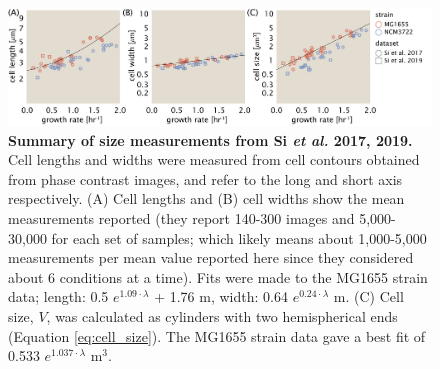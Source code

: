 \begin{figure}
		\centering
    \includegraphics[width=1.0\textwidth]{SI_figs/final_cell_size_Si.pdf}
    \caption{\textbf{Summary of size measurements from Si \textit{et al.} 2017,
    2019.} Cell lengths and widths were measured from cell contours obtained from
    phase contrast images, and refer to the long and short axis respectively. (A)
    Cell lengths and (B) cell widths show the mean measurements reported (they
    report 140-300 images and 5,000-30,000 for each set of samples; which likely
    means about 1,000-5,000 measurements per mean value reported here since they
    considered about 6 conditions at a time). Fits were made to the  MG1655 strain
    data; length: 0.5 $e^{1.09 \cdot \lambda}$ + 1.76 \textmu m, width:  0.64
    $e^{0.24 \cdot \lambda}$ \textmu m. (C) Cell size, $V$, was calculated as
    cylinders with two hemispherical ends (Equation \ref{eq:cell_size}). The
    MG1655 strain data gave a best fit of 0.533 $e^{1.037 \cdot \lambda}$ \textmu m$^3$.}
  \label{fig:final_size_data_Si}
\end{figure}

